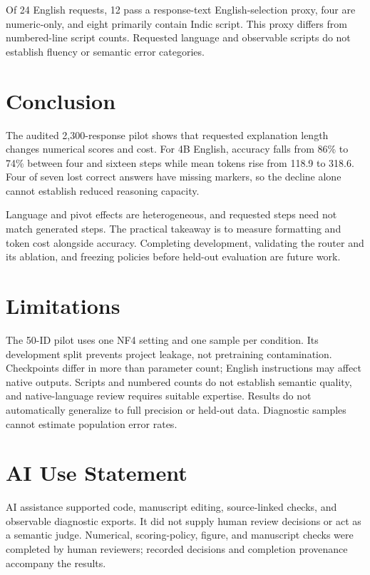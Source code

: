 \documentclass[11pt]{article}
\begin{document}
Of 24 English requests, 12 pass a response-text English-selection proxy, four are numeric-only, and eight primarily contain Indic script. This proxy differs from numbered-line script counts. Requested language and observable scripts do not establish fluency or semantic error categories.

\section{Conclusion}
The audited 2,300-response pilot shows that requested explanation length changes numerical scores and cost. For 4B English, accuracy falls from 86\% to 74\% between four and sixteen steps while mean tokens rise from 118.9 to 318.6. Four of seven lost correct answers have missing markers, so the decline alone cannot establish reduced reasoning capacity.

Language and pivot effects are heterogeneous, and requested steps need not match generated steps. The practical takeaway is to measure formatting and token cost alongside accuracy. Completing development, validating the router and its ablation, and freezing policies before held-out evaluation are future work.

\section*{Limitations}
The 50-ID pilot uses one NF4 setting and one sample per condition. Its development split prevents project leakage, not pretraining contamination. Checkpoints differ in more than parameter count; English instructions may affect native outputs. Scripts and numbered counts do not establish semantic quality, and native-language review requires suitable expertise. Results do not automatically generalize to full precision or held-out data. Diagnostic samples cannot estimate population error rates.

\section*{AI Use Statement}
AI assistance supported code, manuscript editing, source-linked checks, and observable diagnostic exports. It did not supply human review decisions or act as a semantic judge. Numerical, scoring-policy, figure, and manuscript checks were completed by human reviewers; recorded decisions and completion provenance accompany the results.

\clearpage

\end{document}
